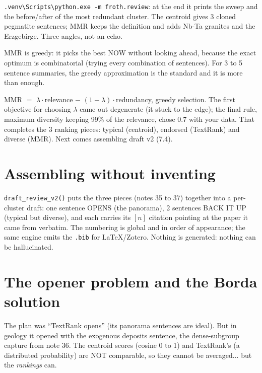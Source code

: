 \documentclass[11pt,a4paper]{article}
\begin{document}
\begin{practica}
\texttt{.venv\textbackslash Scripts\textbackslash python.exe -m froth.review}: at the end it
prints the sweep and the before/after of the most redundant cluster. The centroid gives 3
cloned pegmatite sentences; MMR keeps the definition and adds Nb-Ta granites and the
Erzgebirge. Three angles, not an echo.
\end{practica}

\begin{ojo}
MMR is greedy: it picks the best NOW without looking ahead, because the exact optimum is
combinatorial (trying every combination of sentences). For 3 to 5 sentence summaries, the
greedy approximation is the standard and it is more than enough.
\end{ojo}

\begin{resumen}
MMR $=$ $\lambda \cdot$relevance $-$ $(1-\lambda) \cdot$redundancy, greedy selection. The first
objective for choosing $\lambda$ came out degenerate (it stuck to the edge); the final rule,
maximum diversity keeping 99\% of the relevance, chose 0.7 with your data. That completes the 3
ranking pieces: typical (centroid), endorsed (TextRank) and diverse (MMR). Next comes
assembling draft v2 (7.4).
\end{resumen}
\clearpage
{}
{}

\section{Assembling without inventing}

\texttt{draft\_review\_v2()} puts the three pieces (notes 35 to 37) together into a per-cluster
draft: one sentence OPENS (the panorama), 2 sentences BACK IT UP (typical but diverse), and
each carries its $[n]$ citation pointing at the paper it came from verbatim. The numbering is
global and in order of appearance; the same engine emits the \texttt{.bib} for LaTeX/Zotero.
Nothing is generated: nothing can be hallucinated.

\section{The opener problem and the Borda solution}

The plan was ``TextRank opens'' (its panorama sentences are ideal). But in geology it opened
with the exogenous deposits sentence, the dense-subgroup capture from note 36. The centroid
scores (cosine 0 to 1) and TextRank's (a distributed probability) are NOT comparable, so they
cannot be averaged... but the \emph{rankings} can.
\end{document}
